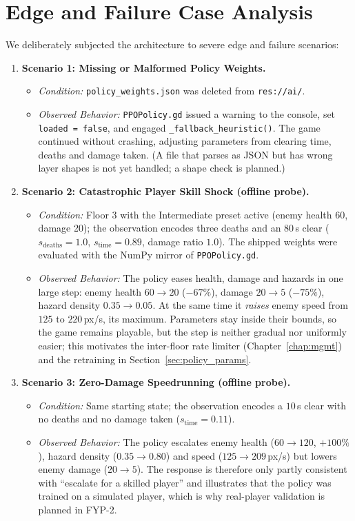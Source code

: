 \section{Edge and Failure Case Analysis}
We deliberately subjected the architecture to severe edge and failure scenarios:
\begin{enumerate}
    \item \textbf{Scenario 1: Missing or Malformed Policy Weights.}
    \begin{itemize}
        \item \textit{Condition:} \texttt{policy\_weights.json} was deleted from \texttt{res://ai/}.
        \item \textit{Observed Behavior:} \texttt{PPOPolicy.gd} issued a warning to the console, set \texttt{loaded = false}, and engaged \texttt{\_fallback\_heuristic()}. The game continued without crashing, adjusting parameters from clearing time, deaths and damage taken. (A file that parses as JSON but has wrong layer shapes is not yet handled; a shape check is planned.)
    \end{itemize}
    \item \textbf{Scenario 2: Catastrophic Player Skill Shock (offline probe).}
    \begin{itemize}
        \item \textit{Condition:} Floor 3 with the Intermediate preset active (enemy health 60, damage 20); the observation encodes three deaths and an $80$\,s clear ($s_{\text{deaths}} = 1.0$, $s_{\text{time}} = 0.89$, damage ratio $1.0$). The shipped weights were evaluated with the NumPy mirror of \texttt{PPOPolicy.gd}.
        \item \textit{Observed Behavior:} The policy eases health, damage and hazards in one large step: enemy health $60 \rightarrow 20$ ($-67\%$), damage $20 \rightarrow 5$ ($-75\%$), hazard density $0.35 \rightarrow 0.05$. At the same time it \emph{raises} enemy speed from $125$ to $220$\,px/s, its maximum. Parameters stay inside their bounds, so the game remains playable, but the step is neither gradual nor uniformly easier; this motivates the inter-floor rate limiter (Chapter~\ref{chap:mgmt}) and the retraining in Section~\ref{sec:policy_params}.
    \end{itemize}
    \item \textbf{Scenario 3: Zero-Damage Speedrunning (offline probe).}
    \begin{itemize}
        \item \textit{Condition:} Same starting state; the observation encodes a $10$\,s clear with no deaths and no damage taken ($s_{\text{time}} = 0.11$).
        \item \textit{Observed Behavior:} The policy escalates enemy health ($60 \rightarrow 120$, $+100\%$), hazard density ($0.35 \rightarrow 0.80$) and speed ($125 \rightarrow 209$\,px/s) but lowers enemy damage ($20 \rightarrow 5$). The response is therefore only partly consistent with ``escalate for a skilled player'' and illustrates that the policy was trained on a simulated player, which is why real-player validation is planned in FYP-2.
    \end{itemize}
\end{enumerate}

